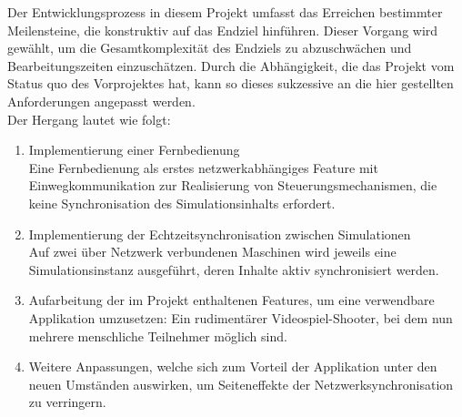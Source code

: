 \label{sec:proceedings}

Der Entwicklungsprozess in diesem Projekt umfasst das Erreichen bestimmter Meilensteine, die konstruktiv auf das Endziel hinführen. Dieser Vorgang wird gewählt, um die Gesamtkomplexität des Endziels zu abzuschwächen und Bearbeitungszeiten einzuschätzen. Durch die Abhängigkeit, die das Projekt vom Status quo des Vorprojektes hat, kann so dieses sukzessive an die hier gestellten Anforderungen angepasst werden.\\
Der Hergang lautet wie folgt:
\begin{enumerate}
\item Implementierung einer Fernbedienung\\
Eine Fernbedienung als erstes netzwerkabhängiges Feature mit Einwegkommunikation zur Realisierung von Steuerungsmechanismen, die keine Synchronisation des Simulationsinhalts erfordert.
\item Implementierung der Echtzeitsynchronisation zwischen Simulationen\\
Auf zwei über Netzwerk verbundenen Maschinen wird jeweils eine Simulationsinstanz ausgeführt, deren Inhalte aktiv synchronisiert werden.
\item Aufarbeitung der im Projekt enthaltenen Features, um eine verwendbare Applikation umzusetzen: Ein rudimentärer Videospiel-Shooter, bei dem nun mehrere menschliche Teilnehmer möglich sind.
\item Weitere Anpassungen, welche sich zum Vorteil der Applikation unter den neuen Umständen auswirken, um Seiteneffekte der Netzwerksynchronisation zu verringern.
\end{enumerate}


